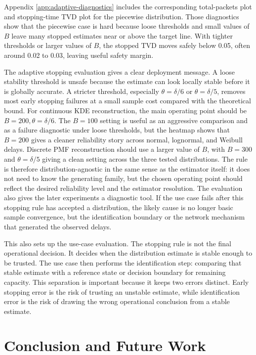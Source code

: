 \documentclass[a4paper,11pt]{report}
\begin{document}
Appendix \ref{app:adaptive-diagnostics} includes the corresponding total-packets plot and stopping-time TVD plot for the piecewise distribution. Those diagnostics show that the piecewise case is hard because loose thresholds and small values of \(B\) leave many stopped estimates near or above the target line. With tighter thresholds or larger values of \(B\), the stopped TVD moves safely below 0.05, often around 0.02 to 0.03, leaving useful safety margin.

The adaptive stopping evaluation gives a clear deployment message. A loose stability threshold is unsafe because the estimate can look locally stable before it is globally accurate. A stricter threshold, especially \(\theta=\delta/6\) or \(\theta=\delta/5\), removes most early stopping failures at a small sample cost compared with the theoretical bound. For continuous KDE reconstruction, the main operating point should be \(B=200,\theta=\delta/6\). The \(B=100\) setting is useful as an aggressive comparison and as a failure diagnostic under loose thresholds, but the heatmap shows that \(B=200\) gives a cleaner reliability story across normal, lognormal, and Weibull delays. Discrete PMF reconstruction should use a larger value of \(B\), with \(B=300\) and \(\theta=\delta/5\) giving a clean setting across the three tested distributions. The rule is therefore distribution-agnostic in the same sense as the estimator itself: it does not need to know the generating family, but the chosen operating point should reflect the desired reliability level and the estimator resolution. The evaluation also gives the later experiments a diagnostic tool. If the use case fails after this stopping rule has accepted a distribution, the likely cause is no longer basic sample convergence, but the identification boundary or the network mechanism that generated the observed delays.

This also sets up the use-case evaluation. The stopping rule is not the final operational decision. It decides when the distribution estimate is stable enough to be trusted. The use case then performs the identification step: comparing that stable estimate with a reference state or decision boundary for remaining capacity. This separation is important because it keeps two errors distinct. Early stopping error is the risk of trusting an unstable estimate, while identification error is the risk of drawing the wrong operational conclusion from a stable estimate.

\chapter{Conclusion and Future Work}
\end{document}
